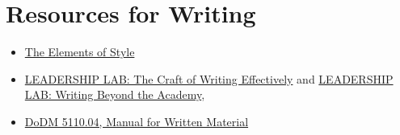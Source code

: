 \section*{Resources for Writing\label{sec:resources-for-writing}}

\begin{itemize}
    \item \href{https://en.wikipedia.org/wiki/The_Elements_of_Style}{The Elements of Style}


\item \href{https://www.youtube.com/watch?v=vtIzMaLkCaM}{LEADERSHIP LAB: The Craft of Writing Effectively}
and \href{https://www.youtube.com/watch?v=aFwVf5a3pZM}{LEADERSHIP LAB: Writing Beyond the Academy},

\item \href{https://www.google.com/search?q=dodm+5110.04}{DoDM 5110.04, Manual for Written Material}
\end{itemize}

